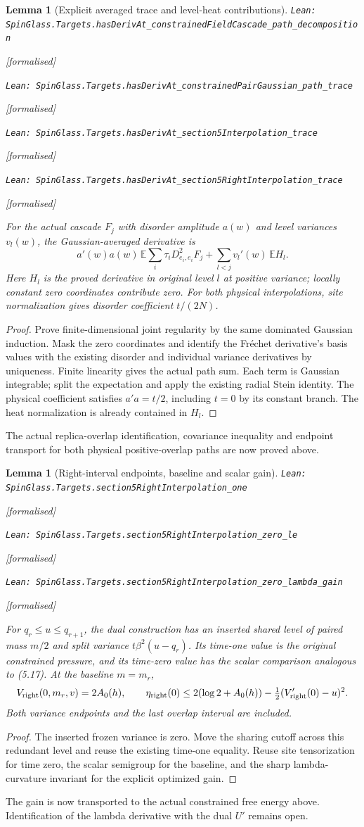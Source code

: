 \documentclass[11pt]{article}
\providecommand{\lean}[1]{\leavevmode\par\nopagebreak
  {\noindent\normalfont\footnotesize\raggedright\texttt{Lean: #1}\par}\nopagebreak}
\providecommand{\leanok}{\par\nopagebreak
  {\noindent\normalfont\footnotesize\textcolor{green!50!black}{[formalised]}\par}\nopagebreak}
\newtheorem{lemma}[theorem]{Lemma}
\begin{document}
\begin{lemma}[Explicit averaged trace and level-heat contributions]
\lean{SpinGlass.Targets.hasDerivAt\_constrainedFieldCascade\_path\_decomposition}\leanok
\lean{SpinGlass.Targets.hasDerivAt\_constrainedPairGaussian\_path\_trace}\leanok
\lean{SpinGlass.Targets.hasDerivAt\_section5Interpolation\_trace}\leanok
\lean{SpinGlass.Targets.hasDerivAt\_section5RightInterpolation\_trace}\leanok
For the actual cascade $F_j$ with disorder amplitude $a(w)$ and level
variances $v_l(w)$, the Gaussian-averaged derivative is
\[
 a'(w)a(w)\,\mathbb E\!\sum_i\tau_i
   D^2_{e_i,e_i}F_j
   +\sum_{l<j}v_l'(w)\,\mathbb E H_l.
\]
Here $H_l$ is the proved derivative in original level $l$ at positive variance;
locally constant zero coordinates contribute zero. For both physical
interpolations, site normalization gives disorder coefficient $t/(2N)$.
\end{lemma}
\begin{proof}
Prove finite-dimensional joint regularity by the same dominated Gaussian
induction. Mask the zero coordinates and identify the Fr\'echet derivative's
basis values with the existing disorder and individual variance derivatives
by uniqueness. Finite linearity gives the actual path sum. Each term is
Gaussian integrable; split the expectation and apply the existing radial
Stein identity. The physical coefficient satisfies $a'a=t/2$, including
$t=0$ by its constant branch. The heat normalization is already contained in $H_l$.
\end{proof}
The actual replica-overlap identification, covariance inequality and endpoint
transport for both physical positive-overlap paths are now proved above.

\begin{lemma}[Right-interval endpoints, baseline and scalar gain]
\lean{SpinGlass.Targets.section5RightInterpolation\_one}\leanok
\lean{SpinGlass.Targets.section5RightInterpolation\_zero\_le}\leanok
\lean{SpinGlass.Targets.section5RightInterpolation\_zero\_lambda\_gain}\leanok
For $q_r\le u\le q_{r+1}$, the dual construction has an inserted shared level
of paired mass $m/2$ and split variance $t\beta^2(u-q_r)$. Its time-one value
is the original constrained pressure, and its time-zero value has the scalar
comparison analogous to (5.17). At the baseline $m=m_r$,
\[
 V_{\rm right}(0,m_r,v)=2A_0(h),\qquad
 \eta_{\rm right}(0)\le2(\log2+A_0(h))
       -\tfrac12(V_{\rm right}'(0)-u)^2.
\]
Both variance endpoints and the last overlap interval are included.
\end{lemma}
\begin{proof}
The inserted frozen variance is zero. Move the sharing cutoff across this
redundant level and reuse the existing time-one equality. Reuse site
tensorization for time zero, the scalar semigroup for the baseline, and the
sharp lambda-curvature invariant for the explicit optimized gain.
\end{proof}
The gain is now transported to the actual constrained free energy above.
Identification of the lambda derivative with the dual $U'$ remains open.
\end{document}
